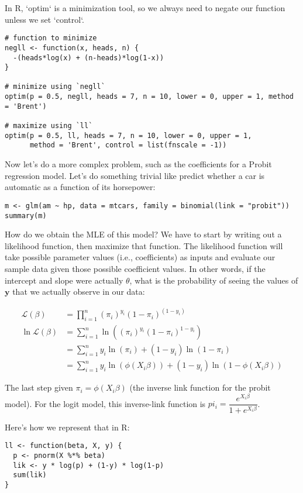 \documentclass[a4paper,12pt]{article}
\newcommand{\matr}[1]{\mathbf{#1}}
\newcommand{\lik}{\mathcal{L}}
\begin{document}
In R, `optim` is a minimization tool, so we always need to negate our function unless we set `control`.

\begin{lstlisting}
# function to minimize
negll <- function(x, heads, n) {
  -(heads*log(x) + (n-heads)*log(1-x))
}

# minimize using `negll`
optim(p = 0.5, negll, heads = 7, n = 10, lower = 0, upper = 1, method = 'Brent')

# maximize using `ll`
optim(p = 0.5, ll, heads = 7, n = 10, lower = 0, upper = 1, 
      method = 'Brent', control = list(fnscale = -1))
\end{lstlisting}


Now let's do a more complex problem, such as the coefficients for a Probit regression model. Let's do something trivial like predict whether a car is automatic as a function of its horsepower:

\begin{lstlisting}
m <- glm(am ~ hp, data = mtcars, family = binomial(link = "probit"))
summary(m)
\end{lstlisting}

How do we obtain the MLE of this model? We have to start by writing out a likelihood function, then maximize that function. The likelihood function will take possible parameter values (i.e., coefficients) as inputs and evaluate our sample data given those possible coefficient values. In other words, if the intercept and slope were actually $\theta$, what is the probability of seeing the values of $\matr{y}$ that we actually observe in our data:

\begin{align*}
\lik(\beta) & = \prod_{i=1}^{n} (\pi_i)^{y_i} (1-\pi_i)^(1-y_i)\\
\ln\lik(\beta) & = \sum_{i=1}^{n} \ln((\pi_i)^{y_i} (1-\pi_i)^{1-y_i}) \\
 & = \sum_{i=1}^{n} y_i \ln(\pi_i) + (1-y_i) \ln(1-\pi_i)\\
 & = \sum_{i=1}^{n} y_i \ln(\phi(X_i\beta)) + (1-y_i) \ln(1-\phi(X_i\beta))
\end{align*}

The last step given $\pi_i = \phi(X_i\beta)$ (the inverse link function for the probit model). For the logit model, this inverse-link function is $pi_i = \dfrac{e^{X_i\beta}}{1+ e^{X_i\beta}}$.

Here's how we represent that in R:

\begin{lstlisting}
ll <- function(beta, X, y) {
  p <- pnorm(X %*% beta)
  lik <- y * log(p) + (1-y) * log(1-p)
  sum(lik)
}
\end{lstlisting}
\end{document}
